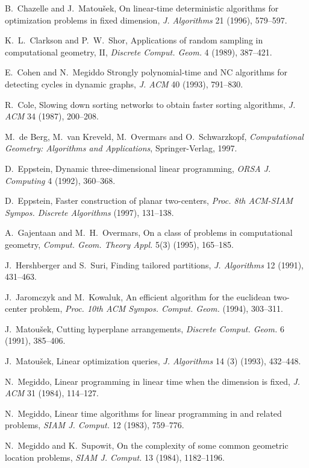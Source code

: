 \documentclass[a4paper,12pt]{article}
\begin{document}
\begin{thebibliography}{}
B.~Chazelle and J.~Matou\v{s}ek,
On linear-time deterministic algorithms for optimization problems
in fixed dimension,
{\it J. Algorithms} 21 (1996), 579--597.

K.~L.~Clarkson and P.~W.~Shor,
Applications of random sampling in computational geometry,
II, {\it Discrete Comput. Geom.} 4 (1989), 387--421.

E.~Cohen and N.~Megiddo
Strongly polynomial-time and NC algorithms for detecting cycles in dynamic graphs,
{\it J. ACM} 40 (1993), 791--830.

R.~Cole, Slowing down sorting networks to obtain faster sorting
algorithms, {\it J. ACM} 34 (1987), 200--208.

M.~de Berg, M.~van Kreveld, M.~Overmars and O.~Schwarzkopf,
{\it Computational Geometry: Algorithms and Applications},
Springer-Verlag, 1997.

D.~Eppstein,
Dynamic three-dimensional linear programming,
{\it ORSA J. Computing} 4 (1992), 360--368.

D.~Eppstein,
Faster construction of planar two-centers,
{\it Proc. 8th ACM-SIAM Sympos. Discrete Algorithms} (1997), 131--138.

A.~Gajentaan and M.~H.~Overmars,
On a class of  problems in computational geometry,
{\it Comput. Geom. Theory Appl.} 5(3) (1995), 165--185.

J.~Hershberger and S.~Suri,
Finding tailored partitions,
{\it J. Algorithms} 12 (1991), 431--463.

J.~Jaromczyk and M.~Kowaluk,
An efficient algorithm for the euclidean two-center problem,
{\it Proc. 10th ACM Sympos. Comput. Geom.} (1994), 303--311.

J.~Matou\v{s}ek,
Cutting hyperplane arrangements,
{\it Discrete Comput. Geom.} 6 (1991), 385--406.

J.~Matou\v{s}ek,
Linear optimization queries,
{\it J. Algorithms} 14 (3) (1993), 432--448.

N.~Megiddo,
Linear programming in linear time when the dimension is fixed,
{\it J. ACM} 31 (1984), 114--127.

N.~Megiddo,
Linear time algorithms for linear programming in 
and related problems,
{\it SIAM J. Comput.} 12 (1983), 759--776.

N.~Megiddo and K.~Supowit,
On the complexity of some common geometric location problems,
{\it SIAM J. Comput.} 13 (1984), 1182--1196.


\end{thebibliography}
\end{document}
